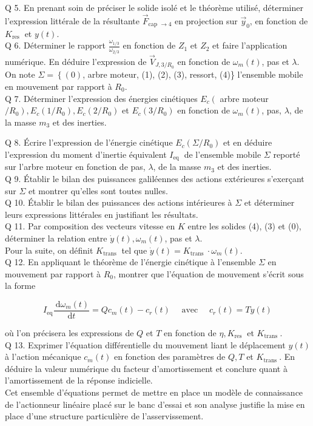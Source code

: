 Q 5. En prenant soin de préciser le solide isolé et le théorème utilisé, déterminer l'expression littérale de la résultante $\vec{F}_{\text {cap } \rightarrow 4}$ en projection sur $\vec{y}_{0}$, en fonction de $K_{\text {res }}$ et $y(t)$.\\
Q 6. Déterminer le rapport $\frac{\omega_{1 / 3}}{\omega_{2 / 3}}$ en fonction de $Z_{1}$ et $Z_{2}$ et faire l'application numérique. En déduire l'expression de $\vec{V}_{J, 3 / R_{0}}$ en fonction de $\omega_{m}(t)$, pas et $\lambda$.\\
On note $\Sigma=\left\{(0)\right.$, arbre moteur, (1), (2), (3), ressort, (4)\} l'ensemble mobile en mouvement par rapport à $R_{0}$.\\
Q 7. Déterminer l'expression des énergies cinétiques $E_{c}\left(\right.$ arbre moteur $\left./ R_{0}\right), E_{c}\left(1 / R_{0}\right), E_{c}\left(2 / R_{0}\right)$ et $E_{c}\left(3 / R_{0}\right)$ en fonction de $\omega_{m}(t)$, pas, $\lambda$, de la masse $m_{3}$ et des inerties.

Q 8. Écrire l'expression de l'énergie cinétique $E_{c}\left(\Sigma / R_{0}\right)$ et en déduire l'expression du moment d'inertie équivalent $I_{\text {eq }}$ de l'ensemble mobile $\Sigma$ reporté sur l'arbre moteur en fonction de pas, $\lambda$, de la masse $m_{3}$ et des inerties.\\
Q 9. Établir le bilan des puissances galiléennes des actions extérieures s'exerçant sur $\Sigma$ et montrer qu'elles sont toutes nulles.\\
Q 10. Établir le bilan des puissances des actions intérieures à $\Sigma$ et déterminer leurs expressions littérales en justifiant les résultats.\\
Q 11. Par composition des vecteurs vitesse en $K$ entre les solides (4), (3) et (0), déterminer la relation entre $\dot{y}(t), \omega_{m}(t)$, pas et $\lambda$.\\
Pour la suite, on définit $K_{\text {trans }}$ tel que $\dot{y}(t)=K_{\text {trans }} \cdot \omega_{m}(t)$.\\
Q 12. En appliquant le théorème de l'énergie cinétique à l'ensemble $\Sigma$ en mouvement par rapport à $R_{0}$, montrer que l'équation de mouvement s'écrit sous la forme

$$
I_{\mathrm{eq}} \frac{\mathrm{~d} \omega_{m}(t)}{\mathrm{d} t}=Q c_{m}(t)-c_{r}(t) \quad \text { avec } \quad c_{r}(t)=T y(t)
$$

où l'on précisera les expressions de $Q$ et $T$ en fonction de $\eta, K_{\text {res }}$ et $K_{\text {trans }}$.\\
Q 13. Exprimer l'équation différentielle du mouvement liant le déplacement $y(t)$ à l'action mécanique $c_{m}(t)$ en fonction des paramètres de $Q, T$ et $K_{\text {trans }}$. En déduire la valeur numérique du facteur d'amortissement et conclure quant à l'amortissement de la réponse indicielle.\\
Cet ensemble d'équations permet de mettre en place un modèle de connaissance de l'actionneur linéaire placé sur le banc d'essai et son analyse justifie la mise en place d'une structure particulière de l'asservissement.


